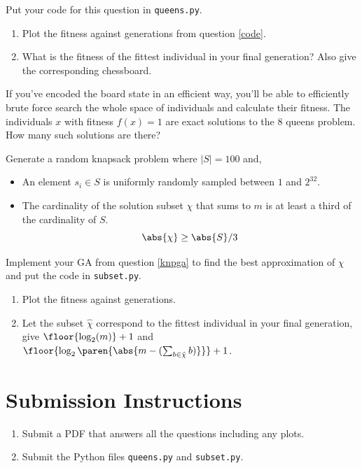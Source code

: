 \documentclass{homework}
\begin{document}
Put your code for this question in \texttt{queens.py}.

\begin{enumerate}
  \item Plot the fitness against generations from question \ref{code}.
  \item What is the fitness of the fittest individual in your final
        generation? Also give the corresponding chessboard.
\end{enumerate}

\question If you've encoded the board state in an efficient way, you'll be
able to efficiently brute force search the whole space of
individuals and calculate their fitness. The individuals $x$ with
fitness $f(x) = 1$ are exact solutions to the 8 queens problem.
How many such solutions are there?

\question Generate a random knapsack problem where $|S| = 100$ and,
\begin{itemize}
  \item An element $s_i \in S$ is uniformly randomly sampled between $1$ and $2^{32}$.
  \item The cardinality of the solution subset $\chi$ that sums to $m$
  is at least a third of the cardinality of $S$.
  \[
    \abs{\chi} \geq \abs{S}/3
  \]
\end{itemize}

Implement your GA from question \ref{knpga} to find the best
approximation of $\chi$ and put the code in \texttt{subset.py}.

\begin{enumerate}
  \item Plot the fitness against generations.
  \item Let the subset $\hat{\chi}$ correspond to the fittest
  individual in your final generation, give $\floor{\log_2(m)} + 1$
  and $\floor{\log_2\paren{\abs{m - (\sum_{b \in \hat{\chi}} b)}}} + 1$.
\end{enumerate}

\section*{Submission Instructions}
\begin{enumerate}
  \item Submit a PDF that answers all the questions including any plots.
  \item Submit the Python files \eg \texttt{queens.py} and \texttt{subset.py}.
\end{enumerate}
\end{document}
